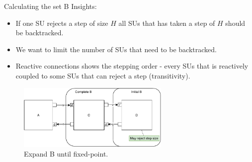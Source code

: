 \documentclass{beamer}
\begin{document}
\begin{frame}{Calculating the set B}
    Insights:
    \begin{itemize}
        \item If one SU rejects a step of size $H$ all SUs that has taken a step of $H$ should be backtracked.
        \item We want to limit the number of SUs that need to be backtracked.
        \item Reactive connections shows the stepping order - every SUs that is reactively coupled to some SUs that can reject a step (transitivity).
    \end{itemize}
    \begin{figure}    
        \includegraphics[width=0.65\textwidth]{images/calcB.pdf}
        \caption{Expand B until fixed-point.}
    \end{figure}
    
\end{frame}
\end{document}
